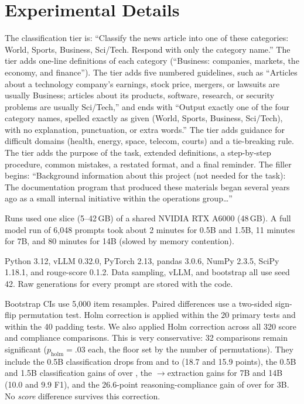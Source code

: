 \section{Experimental Details}
\label{app:details}

The classification \minimal tier is: ``Classify the news article into one of these categories: World, Sports, Business, Sci/Tech. Respond with only the category name.''
The \concise tier adds one-line definitions of each category (\eg ``Business: companies, markets, the economy, and finance'').
The \standard tier adds five numbered guidelines, such as ``Articles about a technology company's earnings, stock price, mergers, or lawsuits are usually Business; articles about its products, software, research, or security problems are usually Sci/Tech,'' and ends with ``Output exactly one of the four category names, spelled exactly as given (World, Sports, Business, Sci/Tech), with no explanation, punctuation, or extra words.''
The \detailed tier adds guidance for difficult domains (health, energy, space, telecom, courts) and a tie-breaking rule.
The \exhaustive tier adds the purpose of the task, extended definitions, a step-by-step procedure, common mistakes, a restated format, and a final reminder.
The \padded filler begins: ``Background information about this project (not needed for the task): The documentation program that produced these materials began several years ago as a small internal initiative within the operations group\ldots''

Runs used one slice (5--42\,GB) of a shared NVIDIA RTX A6000 (48\,GB).
A full model run of 6{,}048 prompts took about 2 minutes for 0.5B and 1.5B, 11 minutes for 7B, and 80 minutes for 14B (slowed by memory contention).

Python 3.12, vLLM 0.32.0, PyTorch 2.13, pandas 3.0.6, NumPy 2.3.5, SciPy 1.18.1, and rouge-score 0.1.2.
Data sampling, vLLM, and bootstrap all use seed 42.
Raw generations for every prompt are stored with the code.

Bootstrap CIs use 5{,}000 item resamples.
Paired differences use a two-sided sign-flip permutation test.
Holm correction is applied within the 20 primary \standard\versus\exhaustive tests and within the 40 padding tests.
We also applied Holm correction across all 320 score and compliance comparisons. This is very conservative: 32 comparisons remain significant ($p_{\text{holm}}=.03$ each, the floor set by the number of permutations). They include the 0.5B classification drops from \minimal and \concise to \standard (18.7 and 15.9 points), the 0.5B and 1.5B classification gains of \padded over \standard, the \minimal$\to$\concise extraction gains for 7B and 14B (10.0 and 9.9 F1), and the 26.6-point reasoning-compliance gain of \exhaustive over \standard for 3B. No \standard\versus\exhaustive \emph{score} difference survives this correction.
